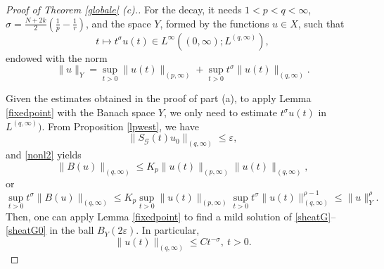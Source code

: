 \documentclass[12pt]{amsart}
\begin{document}
\begin{proof}[Proof of Theorem \ref{globale} (c).]
	For the decay, it needs $1<p<q<\infty$,  $\sigma=\frac{N+2k}{2}\left(\frac{1}{p}-\frac{1}{r}\right)$, and the space
	$Y$, formed by the functions $u\in X$, such that
	\begin{equation*}\label{espX2}
		t\mapsto t^{\sigma}u(t) \in L^{\infty}((0,\infty);L^{(q,\infty)}) ,
	\end{equation*}
	endowed with the norm 
	\begin{equation}
		\|u\|_{Y}= \sup_{t>0}\|u(t)\|_{(p,\infty)} + \sup_{t>0}t^{\sigma}\|u(t)\|_{(q,\infty)}.
	\end{equation}
	
	
	Given the estimates obtained in the proof of part (a), to apply Lemma \ref{fixedpoint} with the Banach space $Y$, we only need to estimate $t^{\sigma}u(t)$ in $L^{(q,\infty)})$. From Proposition \ref{lpwest}, we have
	\begin{equation}\label{desiB2}
		\|S_\mathcal{G}(t) u_0\|_{(q,\infty)}\leq \varepsilon ,
	\end{equation}
	and \eqref{nonl2} yields
	\begin{equation*}
		\|B(u)\|_{(q,\infty)}\leq K_p\|u(t)\|_{(p,\infty)} \|u(t)\|_{(q,\infty)},
	\end{equation*}
	or
	\begin{equation*}
		\sup_{t>0} t^\sigma\|B(u)\|_{(q,\infty)}\leq K_p \sup_{t>0} \|u(t)\|_{(p,\infty)} \sup_{t>0}  t^\sigma\|u(t)\|_{(q,\infty)}^{\rho-1} \leq \|u\|_Y^\rho.
	\end{equation*}
	Then, one can apply Lemma \ref{fixedpoint} to find a mild solution of \eqref{sheatG}--\eqref{sheatG0} in the ball $B_Y(2\varepsilon)$. In particular, 
	\begin{equation*}
		\|u(t)\|_{(q,\infty)}\leq Ct^{-\sigma}, \ t>0.
	\end{equation*}	
	
	
\end{proof}
\end{document}
